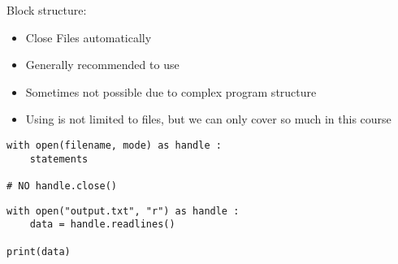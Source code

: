 \begin{frame}[fragile]{Block structure: }
%
\begin{itemize}
\item Close Files automatically
\item Generally recommended to use
\item Sometimes not possible due to complex program structure
\item Using  is not limited to files, but we can only cover so much in this course
\end{itemize}

\vspace{12pt}
\begin{tcbraster}[raster columns=2,
                  raster equal height,
                  nobeforeafter,
                  raster column skip=0.3cm]
\begin{codebox}
\begin{verbatim}
with open(filename, mode) as handle :
    statements

# NO handle.close()
\end{verbatim}
\end{codebox}
%
\begin{codebox}
\begin{verbatim}
with open("output.txt", "r") as handle :
    data = handle.readlines()
    
print(data)
\end{verbatim}
\end{codebox}
\end{tcbraster}
%
\end{frame}


